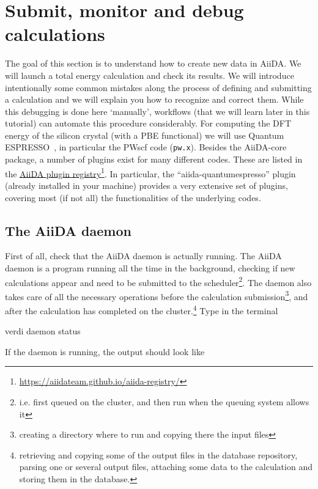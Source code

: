 \section[Submit, monitor and debug calculations]{\label{sec:qe}Submit, monitor and debug calculations}
The goal of this section is to understand how to create new data in AiiDA. We will launch a total energy calculation and check its results. We will introduce intentionally some common mistakes along the process of defining and submitting a calculation and we will explain you how to recognize and correct them. While this debugging is done here `manually', workflows  (that we will learn later in this tutorial) can automate this procedure considerably. 
For computing the DFT energy of the silicon crystal (with a PBE functional) we will use Quantum ESPRESSO~\cite{ref:QE}, in particular the PWscf code (\texttt{pw.x}).
Besides the AiiDA-core package, a number of plugins exist for many different codes.
These are listed in the \href{https://aiidateam.github.io/aiida-registry/}{AiiDA plugin registry}\footnote{\url{https://aiidateam.github.io/aiida-registry/}}.
In particular, the ``aiida-quantumespresso'' plugin (already installed in your machine) provides a very extensive set of plugins, covering most (if not all) the functionalities of the underlying codes.


\subsection{The AiiDA daemon}

First of all, check that the AiiDA daemon is actually running. The AiiDA daemon is a program running all the time in the background, checking if new calculations appear and need to be submitted to the scheduler\footnote[1]{i.e. first queued on the cluster, and then run when the queuing system allows it}. The daemon also takes care of all the necessary operations before the calculation submission\footnote[2]{creating a directory where to run and copying there the input files}, and after the calculation has completed on the cluster.\footnote[3]{retrieving and copying some of the output files in the database repository, parsing one or several output files, attaching some data to the calculation and storing them in the database.}
Type in the terminal
\begin{bashcommand}
verdi daemon status
\end{bashcommand}
If the daemon is running, the output should look like

